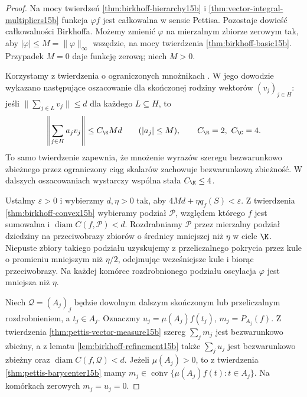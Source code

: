 \begin{proof}
Na mocy twierdzeń \ref{thm:birkhoff-hierarchy15b}
i \ref{thm:vector-integral-multipliers15b} funkcja
$\varphi f$ jest całkowalna w sensie Pettisa.
Pozostaje dowieść całkowalności Birkhoffa.
Możemy zmienić $\varphi$ na mierzalnym zbiorze
zerowym tak, aby $|\varphi|\le M=\|\varphi\|_\infty$
wszędzie, na mocy twierdzenia \ref{thm:birkhoff-basic15b}.
Przypadek $M=0$ daje funkcję zerową; niech $M>0$.

Korzystamy z twierdzenia o ograniczonych mnożnikach
.
W jego dowodzie wykazano następujące oszacowanie
dla skończonej rodziny wektorów $(v_j)_{j\in H}$:
jeśli $\|\sum_{j\in L}v_j\|\le d$ dla każdego
$L\subseteq H$, to
\begin{equation}\label{eq:birkhoff-weighted-sums15b}
 \left\|\sum_{j\in H}a_jv_j\right\|\le C_{\K}Md
 \qquad (|a_j|\le M),\qquad C_{\R}=2,\ C_{\C}=4.
\end{equation}
To samo twierdzenie zapewnia, że mnożenie wyrazów
szeregu bezwarunkowo zbieżnego przez ograniczony
ciąg skalarów zachowuje bezwarunkową zbieżność.
W dalszych oszacowaniach wystarczy wspólna
stała $C_{\K}\le4$.

Ustalmy $\varepsilon>0$ i wybierzmy $d,\eta>0$
tak, aby $4Md+\eta q_f(S)<\varepsilon$.
Z twierdzenia \ref{thm:birkhoff-convex15b}
wybieramy podział $\mathcal P$, względem którego
$f$ jest sumowalna i $\operatorname{diam}C(f,\mathcal P)<d$.
Rozdrabniamy $\mathcal P$ przez mierzalny podział
dziedziny na przeciwobrazy zbiorów o średnicy
mniejszej niż $\eta$ w ciele $\K$.
Niepuste zbiory takiego podziału uzyskujemy
z przeliczalnego pokrycia przez kule o promieniu
mniejszym niż $\eta/2$, odejmując wcześniejsze
kule i biorąc przeciwobrazy. Na każdej komórce
rozdrobnionego podziału oscylacja $\varphi$
jest mniejsza niż $\eta$.

Niech $\mathcal Q=(A_j)_j$ będzie dowolnym dalszym
skończonym lub przeliczalnym rozdrobnieniem, a $t_j\in A_j$.
Oznaczmy $u_j=\mu(A_j)f(t_j)$, $m_j=P_{A_j}(f)$.
Z twierdzenia \ref{thm:pettis-vector-measure15b}
szereg $\sum_jm_j$ jest bezwarunkowo zbieżny,
a z lematu \ref{lem:birkhoff-refinement15b} także
$\sum_j u_j$ jest bezwarunkowo zbieżny oraz
$\operatorname{diam}C(f,\mathcal Q)<d$.
Jeżeli $\mu(A_j)>0$, to z twierdzenia
\ref{thm:pettis-barycenter15b} mamy
$m_j\in\overline{\operatorname{conv}}
 \{\mu(A_j)f(t):t\in A_j\}$.
Na komórkach zerowych $m_j=u_j=0$.


\end{proof}
